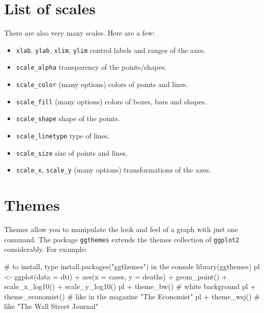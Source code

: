 \documentclass[
  letterpaper,
  DIV=11,
  numbers=noendperiod]{scrreprt}
\newenvironment{Shaded}{\begin{snugshade}}{\end{snugshade}}
\newcommand{\AttributeTok}[1]{\textcolor[rgb]{0.40,0.45,0.13}{#1}}
\newcommand{\CommentTok}[1]{\textcolor[rgb]{0.37,0.37,0.37}{#1}}
\newcommand{\FunctionTok}[1]{\textcolor[rgb]{0.28,0.35,0.67}{#1}}
\newcommand{\NormalTok}[1]{\textcolor[rgb]{0.00,0.23,0.31}{#1}}
\newcommand{\OtherTok}[1]{\textcolor[rgb]{0.00,0.23,0.31}{#1}}
\newcommand{\SpecialCharTok}[1]{\textcolor[rgb]{0.37,0.37,0.37}{#1}}
\providecommand{\tightlist}{%
  \setlength{\itemsep}{0pt}\setlength{\parskip}{0pt}}\usepackage{longtable,booktabs,array}
\begin{document}
\hypertarget{list-of-scales}{%
\section{List of scales}\label{list-of-scales}}

There are also very many scales. Here are a few:

\begin{itemize}
\tightlist
\item
  \texttt{xlab}, \texttt{ylab}, \texttt{xlim}, \texttt{ylim} control
  labels and ranges of the axes.
\item
  \texttt{scale\_alpha} transparency of the points/shapes.
\item
  \texttt{scale\_color} (many options) colors of points and lines.
\item
  \texttt{scale\_fill} (many options) colors of boxes, bars and shapes.
\item
  \texttt{scale\_shape} shape of the points.
\item
  \texttt{scale\_linetype} type of lines.
\item
  \texttt{scale\_size} size of points and lines.
\item
  \texttt{scale\_x}, \texttt{scale\_y} (many options) transformations of
  the axes.
\end{itemize}

\hypertarget{themes}{%
\section{Themes}\label{themes}}

Themes allow you to manipulate the look and feel of a graph with just
one command. The package \texttt{ggthemes} extends the themes collection
of \texttt{ggplot2} considerably. For example:

\begin{Shaded}
\begin{Highlighting}[]
\CommentTok{\# to install, type install.packages("ggthemes") in the console}
\FunctionTok{library}\NormalTok{(ggthemes)}
\NormalTok{pl }\OtherTok{\textless{}{-}} \FunctionTok{ggplot}\NormalTok{(}\AttributeTok{data =}\NormalTok{ dti) }\SpecialCharTok{+} \FunctionTok{aes}\NormalTok{(}\AttributeTok{x =}\NormalTok{ cases, }\AttributeTok{y =}\NormalTok{ deaths) }\SpecialCharTok{+}
    \FunctionTok{geom\_point}\NormalTok{() }\SpecialCharTok{+} \FunctionTok{scale\_x\_log10}\NormalTok{() }\SpecialCharTok{+} \FunctionTok{scale\_y\_log10}\NormalTok{()}
\NormalTok{pl }\SpecialCharTok{+} \FunctionTok{theme\_bw}\NormalTok{() }\CommentTok{\# white background}
\NormalTok{pl }\SpecialCharTok{+} \FunctionTok{theme\_economist}\NormalTok{() }\CommentTok{\# like in the magazine "The Economist"}
\NormalTok{pl }\SpecialCharTok{+} \FunctionTok{theme\_wsj}\NormalTok{() }\CommentTok{\# like "The Wall Street Journal"}
\end{Highlighting}
\end{Shaded}
\end{document}
